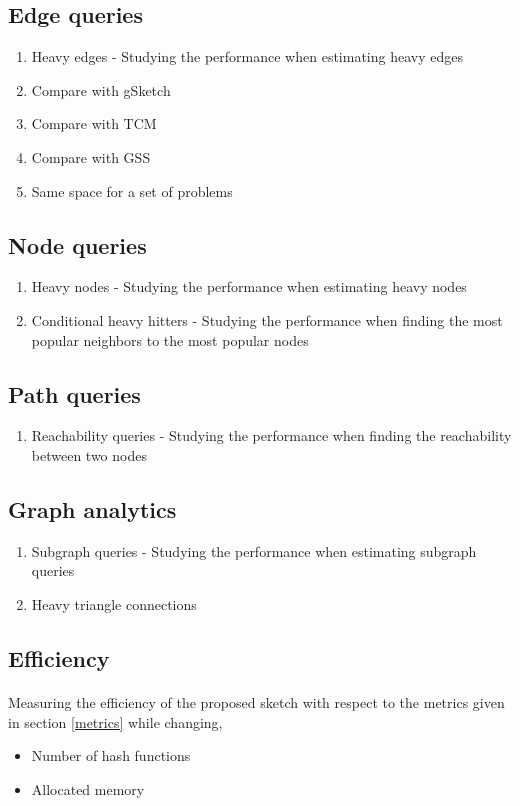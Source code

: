 \subsection{Edge queries}

\begin{enumerate}
    \item Heavy edges - Studying the performance when estimating heavy edges
    \item Compare with gSketch
    \item Compare with TCM
    \item Compare with GSS
    \item Same space for a set of problems
\end{enumerate}

\subsection{Node queries}

\begin{enumerate}
    \item Heavy nodes - Studying the performance when estimating heavy nodes
    \item Conditional heavy hitters - Studying the performance when finding the most popular neighbors to the most popular nodes 
\end{enumerate}

\subsection{Path queries}

\begin{enumerate}
    \item Reachability queries - Studying the performance when finding the reachability between two nodes
\end{enumerate}

\subsection{Graph analytics}

\begin{enumerate}
    \item Subgraph queries - Studying the performance when estimating subgraph queries
    \item Heavy triangle connections 
\end{enumerate}

\subsection{Efficiency}

\paragraph{}
Measuring the efficiency of the proposed sketch with respect to the metrics given in section \ref{metrics} while changing, 

\begin{itemize}
    \item Number of hash functions
    \item Allocated memory 
\end{itemize}